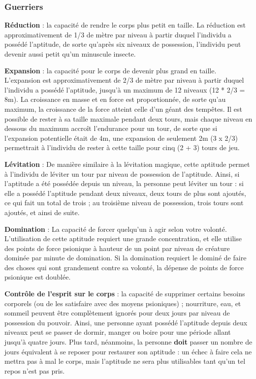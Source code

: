 \documentclass[11pt]{article}
\begin{document}
{\subsubsection*{Guerriers}

\textbf{Réduction} : la capacité de rendre le corps plus petit en taille. La réduction est approximativement de 1/3 de mètre par niveau à partir duquel l'individu a possédé l'aptitude, de sorte qu'après six niveaux de possession, l'individu peut devenir aussi petit qu'un minuscule insecte.

\bigskip

\textbf{Expansion} : la capacité pour le corps de devenir plus grand en taille. L'expansion est approximativement de 2/3 de mètre par niveau à partir duquel l'individu a possédé l'aptitude, jusqu'à un maximum de 12 niveaux (12 * 2/3 = 8m). La croissance en masse et en force est proportionnée, de sorte qu'au maximum, la croissance de la force atteint celle d'un géant des tempêtes. Il est possible de rester à sa taille maximale pendant deux tours, mais chaque niveau en dessous du maximum accroît l'endurance pour un tour, de sorte que si l'expansion potentielle était de 4m, une expansion de seulement 2m (3 x 2/3) permettrait à l'individu de rester à cette taille pour cinq (2 + 3) tours de jeu.

\bigskip

\textbf{Lévitation} : De manière similaire à la lévitation magique, cette aptitude permet à l'individu de léviter un tour par niveau de possession de l'aptitude. Ainsi, si l'aptitude a été possédée depuis un niveau, la personne peut léviter un tour : si elle a possédé l'aptitude pendant deux niveaux, deux tours de plus sont ajoutés, ce qui fait un total de trois ; au troisième niveau de possession, trois tours sont ajoutés, et ainsi de suite.

\bigskip

\textbf{Domination} : La capacité de forcer quelqu'un à agir selon votre volonté. L'utilisation de cette aptitude requiert une grande concentration, et elle utilise des points de force psionique à hauteur de un point par niveau de créature dominée par minute de domination. Si la domination requiert le dominé de faire des choses qui sont grandement contre sa volonté, la dépense de points de force psionique est doublée.

\bigskip

\textbf{Contrôle de l'esprit sur le corps} : la capacité de supprimer certains besoins corporels (ou de les satisfaire avec des moyens psioniques) ; nourriture, eau, et sommeil peuvent être complètement ignorés pour deux jours par niveau de possession du pouvoir. Ainsi, une personne ayant possédé l'aptitude depuis deux niveaux peut se passer de dormir, manger ou boire pour une période allant jusqu'à quatre jours. Plus tard, néanmoins, la personne \textbf{doit} passer un nombre de jours équivalent à se reposer pour restaurer son aptitude : un échec à faire cela ne mettra pas à mal le corps, mais l'aptitude ne sera plus utilisables tant qu'un tel repos n'est pas pris.

}
\end{document}
